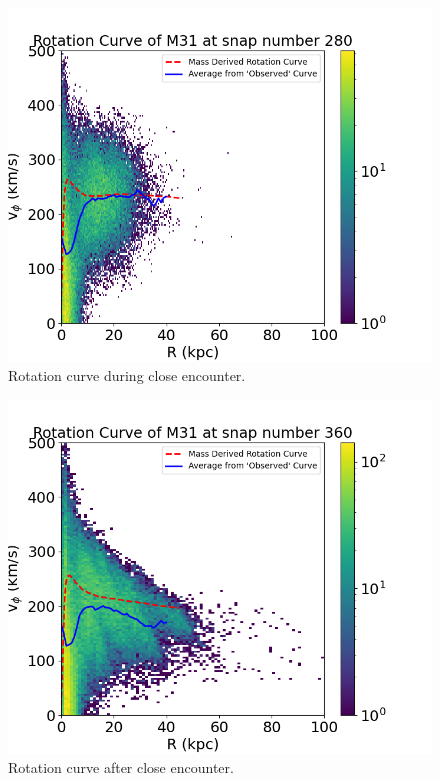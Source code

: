 \documentclass[twocolumn,linenumbers,trackchanges]{aastex7}
\begin{document}
\begin{figure}[ht!]
	\centering
	\includegraphics[width=1.0\linewidth]{M31_280_rotation_curve.png}
	\caption{Rotation curve during close encounter.}
\end{figure}

\begin{figure}[ht!]
	\centering
	\includegraphics[width=1.0\linewidth]{M31_360_rotation_curve.png}
	\caption{Rotation curve after close encounter.}
\end{figure}
\end{document}
